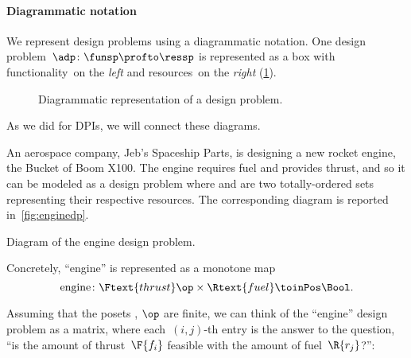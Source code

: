 \paragraph{Diagrammatic notation} We represent design problems using a diagrammatic notation. One design problem~$\adp \colon \funsp \profto \ressp$ is represented as a box with functionality~\funsp on the \emph{left} and resources~\ressp on the \emph{right} (\cref{fig:diagrammaticdp}).
\begin{figure}[h!]
    \begin{center}
    \end{center}
    \caption{Diagrammatic representation of a design problem. \label{fig:diagrammaticdp}}
\end{figure}
As we did for DPIs, we will connect these diagrams.
\begin{example}
    An aerospace company, Jeb's Spaceship Parts, is designing a new rocket engine, the Bucket of Boom X100. The engine requires fuel and provides thrust, and so it can be modeled as a design problem where  and  are two totally-ordered sets representing their respective resources. The corresponding diagram is reported in~\cref{fig:enginedp}.

    \begin{marginfigure}
        \begin{center}
        \end{center}
        \caption{Diagram of the engine design problem. \label{fig:enginedp}}
    \end{marginfigure}

    Concretely, ``engine'' is represented as a monotone map%
    \begin{equation}
        \text{engine} \colon \Ftext{thrust}\op \times \Rtext{fuel} \toinPos \Bool.
    \end{equation}

    Assuming that the posets , $\op$ are finite, we can think of the ``engine'' design problem as a matrix, where each~$(i,j)$-th entry is the answer to the question, ``is the amount of thrust~$\F{f_i}$ feasible with the amount of fuel~$\R{r_j}$?'':


\end{example}
